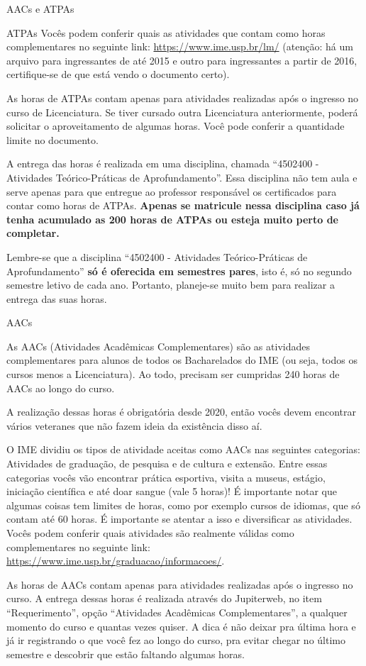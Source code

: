 \begin{secao}{AACs e ATPAs}
\begin{subsecao}{ATPAs}
Vocês podem conferir quais as atividades que contam como horas complementares
no seguinte link: \url{https://www.ime.usp.br/lm/} (atenção: há um arquivo para
ingressantes de até 2015 e outro para ingressantes a partir de 2016,
certifique-se de que está vendo o documento certo).

As horas de ATPAs contam apenas para atividades realizadas após o ingresso no
curso de Licenciatura. Se tiver cursado outra Licenciatura anteriormente, poderá
solicitar o aproveitamento de algumas horas. Você pode conferir a quantidade
limite no documento.

A entrega das horas é realizada em uma disciplina, chamada
``4502400 - Atividades Teórico-Práticas de Aprofundamento''. Essa disciplina não
tem aula e serve apenas para que entregue ao professor responsável os certificados
para contar como horas de ATPAs. \textbf{Apenas se matricule nessa disciplina caso já}
\textbf{tenha acumulado as 200 horas de ATPAs ou esteja muito perto de completar.}

Lembre-se que a disciplina ``4502400 - Atividades Teórico-Práticas de Aprofundamento''
\textbf{só é oferecida em semestres pares}, isto é, só no segundo semestre letivo de cada ano.
Portanto, planeje-se muito bem para realizar a entrega das suas horas.

\end{subsecao}

\begin{subsecao}{AACs}

As AACs (Atividades Acadêmicas Complementares) são as atividades complementares
para alunos de todos os Bacharelados do IME (ou seja, todos os cursos menos a
Licenciatura). Ao todo, precisam ser cumpridas 240 horas de AACs ao longo do curso.

A realização dessas horas é obrigatória desde 2020, então vocês devem encontrar
vários veteranes que não fazem ideia da existência disso aí.

O IME dividiu os tipos de atividade aceitas como AACs nas seguintes categorias:
Atividades de graduação, de pesquisa e de cultura e extensão. Entre essas categorias
vocês vão encontrar prática esportiva, visita a museus, estágio, iniciação científica 
e até doar sangue (vale 5 horas)!
É importante notar que algumas coisas tem limites de horas, como por exemplo
cursos de idiomas, que só contam até 60 horas. É importante se atentar a isso e
diversificar as atividades.
Vocês podem conferir quais atividades são realmente válidas como complementares
no seguinte link: \url{https://www.ime.usp.br/graduacao/informacoes/}.

As horas de AACs contam apenas para atividades realizadas após o ingresso no curso.
A entrega dessas horas é realizada através do Jupiterweb, no item ``Requerimento'',
opção ``Atividades Acadêmicas Complementares'', a qualquer momento do curso e
quantas vezes quiser. A dica é não deixar pra última hora e já ir registrando o que
você fez ao longo do curso, pra evitar chegar no último semestre e descobrir que estão
faltando algumas horas.

\end{subsecao}

\end{secao}
